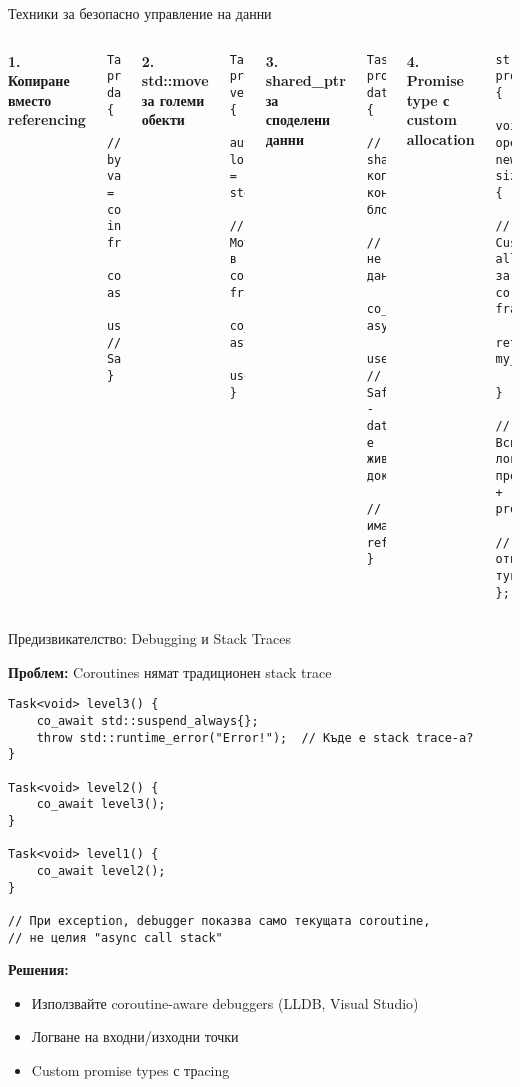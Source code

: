 \documentclass[aspectratio=169]{beamer}
\begin{document}
\begin{frame}[fragile]{Техники за безопасно управление на данни}
\begin{columns}
\textbf{1. Копиране вместо referencing}
\begin{lstlisting}[basicstyle=\ttfamily\tiny]
Task<void> process(std::string data) { 
    // by value = copy in frame
    co_await async_operation();
    use(data);  // Safe
}
\end{lstlisting}

\textbf{2. std::move за големи обекти}
\begin{lstlisting}[basicstyle=\ttfamily\tiny]
Task<void> process(std::vector<int> vec) {
    auto local_vec = std::move(vec); 
    // Move в coroutine frame
    co_await async_operation();
    use(local_vec);
}
\end{lstlisting}

\textbf{3. shared\_ptr за споделени данни}
\begin{lstlisting}[basicstyle=\ttfamily\tiny]
Task<void> process(std::shared_ptr<BigData> data) {  
    // shared_ptr копира контролния блок, 
    // не данните
    co_await async_operation();
    use(*data);  // Safe - data е жив докато
                 // има reference
}
\end{lstlisting}

\textbf{4. Promise type с custom allocation}
\begin{lstlisting}[basicstyle=\ttfamily\tiny]
struct promise_type {
    void* operator new(size_t size) {
      // Custom allocator за coroutine frame
      return my_pool_allocator.allocate(size);
    }
    // Всички локални променливи + promise
    // отиват тук
};
\end{lstlisting}    
\end{columns}
\end{frame}

\begin{frame}[fragile]{Предизвикателство: Debugging и Stack Traces}

\textbf{Проблем:} Coroutines нямат традиционен stack trace

\begin{lstlisting}[basicstyle=\ttfamily\tiny]
Task<void> level3() {
    co_await std::suspend_always{};
    throw std::runtime_error("Error!");  // Къде е stack trace-а?
}

Task<void> level2() {
    co_await level3();
}

Task<void> level1() {
    co_await level2();
}

// При exception, debugger показва само текущата coroutine,
// не целия "async call stack"
\end{lstlisting}

\textbf{Решения:}
\begin{itemize}
    \item Използвайте coroutine-aware debuggers (LLDB, Visual Studio)
    \item Логване на входни/изходни точки
    \item Custom promise types с трacing
\end{itemize}
\end{frame}
\end{document}
